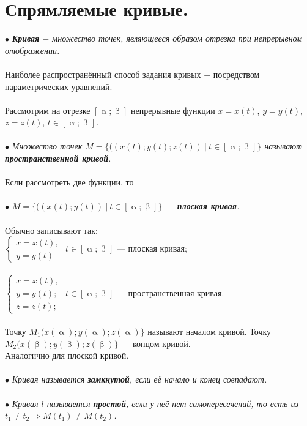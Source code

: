 \section{Спрямляемые кривые.}
$\bullet$ \textit{\textbf{Кривая} $-$ множество точек, являющееся образом отрезка при непрерывном отображении.}\\\\
Наиболее распространённый способ задания кривых $-$ посредством параметрических уравнений.\\\\
Рассмотрим на отрезке $[\upalpha;\upbeta]$ непрерывные функции $x=x(t)$, $y=y(t)$, $z=z(t)$, $t\in[\upalpha;\upbeta]$.\\\\
$\bullet$ \textit{Множество точек $M=\{((x(t); y(t); z(t))\ |\ t\in[\upalpha;\upbeta]\}$ называют \textbf{пространственной кривой}.}\\\\
Если рассмотреть две функции, то\\\\
$\bullet$ \textit{$M=\{((x(t); y(t)) \ |\ t\in[\upalpha;\upbeta]\}$ --- \textbf{плоская кривая}.}\\\\
Обычно записывают так:\\
$\begin{cases}
	x=x(t) , \\ 
	y=y(t)
\end{cases}$ $t\in[\upalpha;\upbeta]$ --- плоская кривая;\\\\
$\begin{cases}
	x=x(t) ,\\ 
	y=y(t) ;\\ 
	z=z(t);
\end{cases}$ $t\in[\upalpha;\upbeta]$ --- пространственная кривая.\\\\
Точку $M_1(x(\upalpha);y(\upalpha);z(\upalpha)\}$ называют началом кривой.
Точку $M_2(x(\upbeta);y(\upbeta);z(\upbeta)\}$ --- концом кривой.\\
Аналогично для плоской кривой.\\\\
$\bullet$ \textit{Кривая называется \textbf{замкнутой}, если её начало и конец совпадают.}\\\\
$\bullet$ \textit{Кривая $l$ называется \textbf{простой}, если у неё нет самопересечений, то есть из $t_1\neq t_2\Rightarrow M(t_1)\neq M(t_2)$.}\\\\

